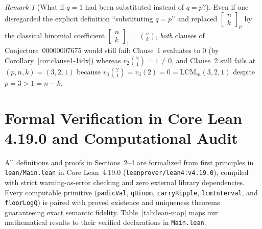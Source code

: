\documentclass[11pt,a4paper]{article}
\theoremstyle{definition}
\theoremstyle{remark}
\newtheorem{remark}[theorem]{Remark}
\newcommand{\qbinom}[3]{\begin{bmatrix} #1 \\ #2 \end{bmatrix}_{#3}}
\begin{document}
\begin{remark}[What if $q = 1$ had been substituted instead of $q = p$?]
Even if one disregarded the explicit definition ``substituting $q = p$'' and replaced
$\qbinom{n}{k}{p}$ by the classical binomial coefficient
$\qbinom{n}{k}{1} = \binom{n}{k}$, \emph{both} clauses of Conjecture~00000007675
would still fail: Clause~1 evaluates to $0$ (by Corollary~\ref{cor:clause1-1idx})
whereas $v_2\!\binom{2}{1} = 1 \neq 0$, and Clause~2 still fails at $(p,n,k) = (3,2,1)$
because $v_3\!\binom{2}{1} = v_3(2) = 0 = \mathrm{LCM}_m(3,2,1)$ despite
$p = 3 > 1 = n - k$.
\end{remark}

\section{Formal Verification in Core Lean 4.19.0 and Computational Audit}

All definitions and proofs in Sections~2--4 are formalized from first principles in
\texttt{lean/Main.lean} in Core Lean~4.19.0 (\texttt{leanprover/lean4:v4.19.0}),
compiled with strict warning-as-error checking and zero external library
dependencies. Every computable primitive (\texttt{padicVal}, \texttt{qBinom},
\texttt{carryRipple}, \texttt{lcmInterval}, and \texttt{floorLogQ}) is paired with
proved existence and uniqueness theorems guaranteeing exact semantic fidelity.
Table~\ref{tab:lean-map} maps our mathematical results to their verified
declarations in \texttt{Main.lean}.
\end{document}
